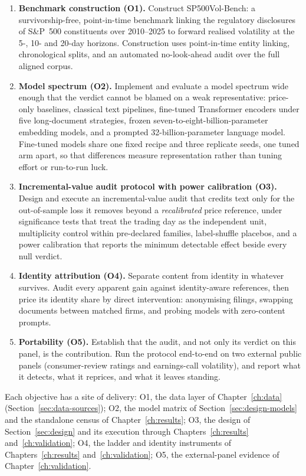 \begin{enumerate}
  \item \textbf{Benchmark construction (O1).} Construct SP500Vol-Bench: a survivorship-free, point-in-time benchmark linking the regulatory disclosures of S\&P~500 constituents over 2010--2025 to forward realised volatility at the 5-, 10- and 20-day horizons. Construction uses point-in-time entity linking, chronological splits, and an automated no-look-ahead audit over the full aligned corpus.
  \item \textbf{Model spectrum (O2).} Implement and evaluate a model spectrum wide enough that the verdict cannot be blamed on a weak representative: price-only baselines, classical text pipelines, fine-tuned Transformer encoders under five long-document strategies, frozen seven-to-eight-billion-parameter embedding models, and a prompted 32-billion-parameter language model. %
  Fine-tuned models share one fixed recipe and three replicate seeds, one tuned arm apart, so that differences measure representation rather than tuning effort or run-to-run luck. %
  \item \textbf{Incremental-value audit protocol with power calibration (O3).} Design and execute an incremental-value audit that credits text only for the out-of-sample loss it removes beyond a \emph{recalibrated} price reference, under significance tests that treat the trading day as the independent unit, multiplicity control within pre-declared families, label-shuffle placebos, and a power calibration that reports the minimum detectable effect beside every null verdict.
  \item \textbf{Identity attribution (O4).} Separate content from identity in whatever survives. Audit every apparent gain against identity-aware references, then price its identity share by direct intervention: anonymising filings, swapping documents between matched firms, and probing models with zero-content prompts.
  \item \textbf{Portability (O5).} Establish that the audit, and not only its verdict on this panel, is the contribution. Run the protocol end-to-end on two external public panels (consumer-review ratings and earnings-call volatility), and report what it detects, what it reprices, and what it leaves standing.
\end{enumerate}

Each objective has a site of delivery: O1, the data layer of Chapter~\ref{ch:data} (Section~\ref{sec:data-sources}); O2, the model matrix of Section~\ref{sec:design-models} and the standalone census of Chapter~\ref{ch:results}; O3, the design of Section~\ref{sec:design} and its execution through Chapters~\ref{ch:results} and~\ref{ch:validation}; O4, the ladder and identity instruments of Chapters~\ref{ch:results} and~\ref{ch:validation}; O5, the external-panel evidence of Chapter~\ref{ch:validation}.


